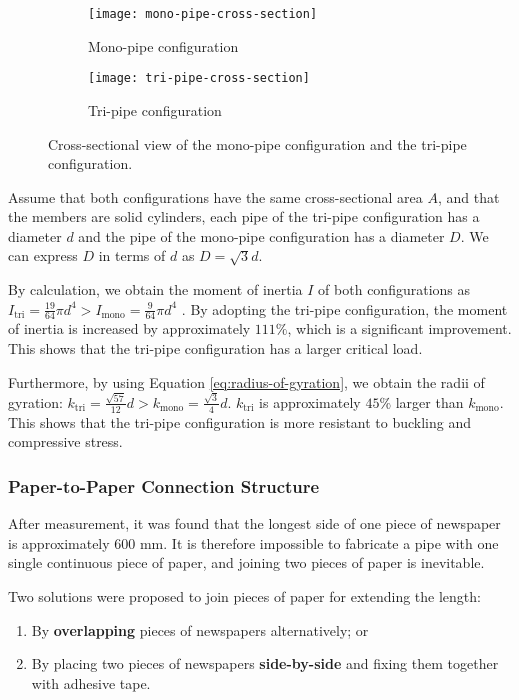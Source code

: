 \documentclass[fleqn,10pt]{SelfArx} %
\begin{document}
\begin{figure}[hbt]
	\centering
	\begin{subfigure}{0.3\linewidth}
		\centering
		\texttt{[image: mono-pipe-cross-section]}
		\caption{Mono-pipe configuration}
		\label{fig:mono-pipe-cross-section}
	\end{subfigure}
	\hspace*{0.1\linewidth}
	\begin{subfigure}{0.3\linewidth}
		\centering
		\texttt{[image: tri-pipe-cross-section]}
		\caption{Tri-pipe configuration}
		\label{fig:tri-pipe-cross-section}
	\end{subfigure}
	\caption{Cross-sectional view of the mono-pipe configuration and the tri-pipe
		configuration.}
\end{figure}

Assume that both configurations have the same cross-sectional area $A$, and that the members
	are solid cylinders, each pipe of the tri-pipe configuration has a diameter $d$ and the
	pipe of the mono-pipe configuration has a diameter $D$. We can express $D$ in terms of $d$
	as $D = \sqrt{3}d$.

By calculation, we obtain the moment of inertia $I$ of both configurations as
	$I_{\text{tri}} = \frac{19}{64}\pi d^4 > I_{\text{mono}} = \frac{9}{64}\pi d^4$
	\cite{Riley:2007-Mechanics}.
	By adopting the tri-pipe configuration, the moment of inertia is increased by
	approximately $111\%$, which is a significant improvement.
	This shows that the tri-pipe configuration has a larger critical load.

Furthermore, by using Equation \ref{eq:radius-of-gyration}, we obtain the radii of gyration:
	$k_{\text{tri}} = \frac{\sqrt{57}}{12}d > k_{\text{mono}} = \frac{\sqrt{3}}{4}d$.
	$k_{\text{tri}}$ is approximately $45\%$ larger than $k_{\text{mono}}$.
	This shows that the tri-pipe configuration is more resistant to buckling and compressive
	stress.

\subsubsection{Paper-to-Paper Connection Structure}

After measurement, it was found that the longest side of one piece of newspaper is
	approximately $600$ mm. It is therefore impossible to fabricate a pipe with one single
	continuous piece of paper, and joining two pieces of paper is inevitable.

Two solutions were proposed to join pieces of paper for extending the length:
	\begin{enumerate}[noitemsep]
		\item By \textbf{overlapping} pieces of newspapers alternatively; or
		\item By placing two pieces of newspapers \textbf{side-by-side} and fixing them
			together with adhesive tape.
	\end{enumerate}
\end{document}
